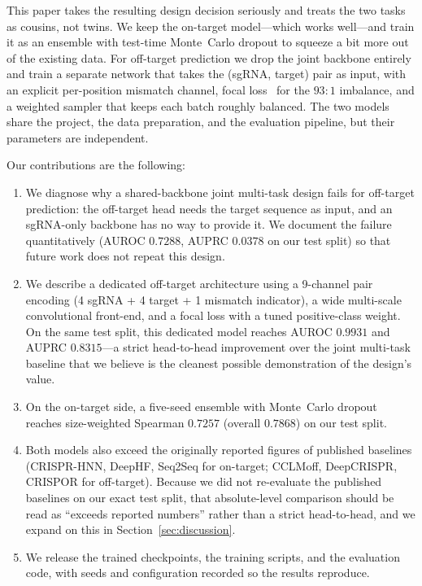 \documentclass[11pt,a4paper]{article}
\begin{document}
This paper takes the resulting design decision seriously and treats the two tasks as cousins, not twins. We keep the on-target model---which works well---and train it as an ensemble with test-time Monte~Carlo dropout to squeeze a bit more out of the existing data. For off-target prediction we drop the joint backbone entirely and train a separate network that takes the (sgRNA, target) pair as input, with an explicit per-position mismatch channel, focal loss~\citep{focal_loss} for the $93{:}1$ imbalance, and a weighted sampler that keeps each batch roughly balanced. The two models share the project, the data preparation, and the evaluation pipeline, but their parameters are independent.

Our contributions are the following:
\begin{enumerate}[leftmargin=*,topsep=2pt,itemsep=2pt]
\item We diagnose why a shared-backbone joint multi-task design fails for off-target prediction: the off-target head needs the target sequence as input, and an sgRNA-only backbone has no way to provide it. We document the failure quantitatively (AUROC $0.7288$, AUPRC $0.0378$ on our test split) so that future work does not repeat this design.
\item We describe a dedicated off-target architecture using a 9-channel pair encoding (4 sgRNA + 4 target + 1 mismatch indicator), a wide multi-scale convolutional front-end, and a focal loss with a tuned positive-class weight. On the same test split, this dedicated model reaches AUROC $0.9931$ and AUPRC $0.8315$---a strict head-to-head improvement over the joint multi-task baseline that we believe is the cleanest possible demonstration of the design's value.
\item On the on-target side, a five-seed ensemble with Monte~Carlo dropout reaches size-weighted Spearman $0.7257$ (overall $0.7868$) on our test split.
\item Both models also exceed the originally reported figures of published baselines (CRISPR-HNN, DeepHF, Seq2Seq for on-target; CCLMoff, DeepCRISPR, CRISPOR for off-target). Because we did not re-evaluate the published baselines on our exact test split, that absolute-level comparison should be read as ``exceeds reported numbers'' rather than a strict head-to-head, and we expand on this in Section~\ref{sec:discussion}.
\item We release the trained checkpoints, the training scripts, and the evaluation code, with seeds and configuration recorded so the results reproduce.
\end{enumerate}
\end{document}
